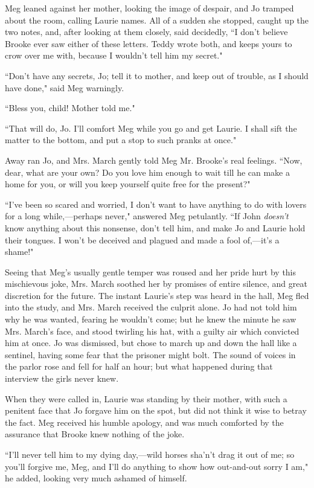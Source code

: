 Meg leaned against her mother, looking the image of despair, and Jo
tramped about the room, calling Laurie names. All of a sudden she
stopped, caught up the two notes, and, after looking at them closely,
said decidedly, ``I don't believe Brooke ever saw either
of these letters. Teddy wrote both, and keeps yours to crow over me
with, because I wouldn't tell him my secret."

``Don't have any secrets, Jo; tell it to mother, and keep
out of trouble, as I should have done," said Meg warningly.

``Bless you, child! Mother told me."

``That will do, Jo. I'll comfort Meg while you go and get
Laurie. I shall sift the matter to the bottom, and put a stop to such
pranks at once."

Away ran Jo, and Mrs. March gently told Meg Mr. Brooke's
real feelings. ``Now, dear, what are your own? Do you love him enough to
wait till he can make a home for you, or will you keep yourself quite
free for the present?"

``I've been so scared and worried, I
don't want to have anything to do with lovers for a long
while,---perhaps never," answered Meg petulantly. ``If John
\emph{doesn't} know anything about this nonsense,
don't tell him, and make Jo and Laurie hold their
tongues. I won't be deceived and plagued and made a fool
of,---it's a shame!"

Seeing that Meg's usually gentle temper was roused and
her pride hurt by this mischievous joke, Mrs. March soothed her by
promises of entire silence, and great discretion for the future. The
instant Laurie's step was heard in the hall, Meg fled
into the study, and Mrs. March received the culprit alone. Jo had not
told him why he was wanted, fearing he wouldn't come;
but he knew the minute he saw Mrs. March's face, and
stood twirling his hat, with a guilty air which convicted him at once.
Jo was dismissed, but chose to march up and down the hall like a
sentinel, having some fear that the prisoner might bolt. The sound of
voices in the parlor rose and fell for half an hour; but what happened
during that interview the girls never knew.

When they were called in, Laurie was standing by their mother, with such
a penitent face that Jo forgave him on the spot, but did not think it
wise to betray the fact. Meg received his humble apology, and was much
comforted by the assurance that Brooke knew nothing of the joke.

``I'll never tell him to my dying day,---wild horses
sha'n't drag it out of me; so
you'll forgive me, Meg, and I'll do
anything to show how out-and-out sorry I am," he added, looking very
much ashamed of himself.

